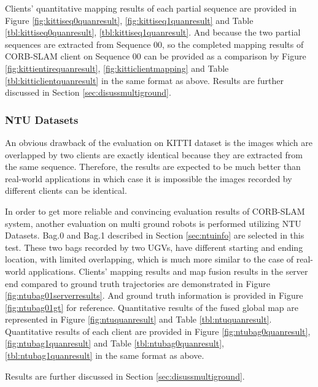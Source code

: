 Clients' quantitative mapping results of each partial sequence are provided in Figure \ref{fig:kittiseq0quanresult}, \ref{fig:kittiseq1quanresult}  and Table \ref{tbl:kittiseq0quanresult}, \ref{tbl:kittiseq1quanresult}. And because the two partial sequences are extracted from Sequence 00, so the completed mapping results of CORB-SLAM client on Sequence 00 can be provided as a comparison by Figure \ref{fig:kittientirequanresult}, \ref{fig:kitticlientmapping} and Table \ref{tbl:kitticlientquanresult} in the same format as above. Results are further discussed in Section \ref{sec:disussmultiground}.



\subsubsection{NTU Datasets}

An obvious drawback of the evaluation on KITTI dataset is the images which are overlapped by two clients are exactly identical because they are extracted from the same sequence. Therefore, the results are expected to be much better than real-world applications in which case it is impossible the images recorded by different clients can be identical.

In order to get more reliable and convincing evaluation results of  CORB-SLAM system, another evaluation on multi ground robots is performed utilizing NTU Datasets. Bag.0 and Bag.1 described in Section \ref{sec:ntuinfo} are selected in this test. These two bags recorded by two UGVs, have different starting and ending location, with limited overlapping, which is much more similar to the case of real-world applications. Clients' mapping results and map fusion results in the server end compared to ground truth trajectories are demonstrated in Figure \ref{fig:ntubag01serverresults}. And ground truth information is provided in Figure \ref{fig:ntubag01gt} for reference. Quantitative results of the fused global map are represented in Figure \ref{fig:ntuquanresult} and Table \ref{tbl:ntuquanresult}. Quantitative results of each client are provided in Figure \ref{fig:ntubag0quanresult}, \ref{fig:ntubag1quanresult} and Table \ref{tbl:ntubag0quanresult}, \ref{tbl:ntubag1quanresult} in the same format as above.

Results are further discussed in Section \ref{sec:disussmultiground}.




